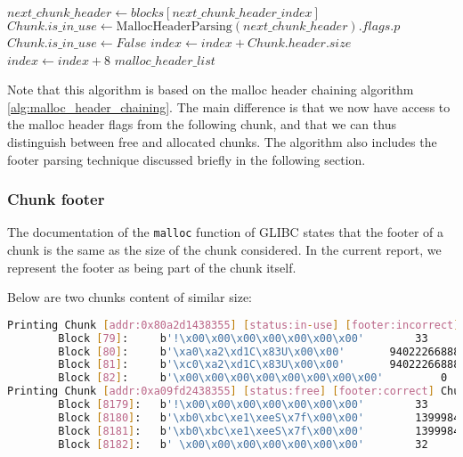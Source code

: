 \begin{algorithm}[H]
\begin{algorithmic}[1]
                        \State $next\_chunk\_header \gets blocks[next\_chunk\_header\_index]$
                        \State $Chunk.is\_in\_use \gets \text{MallocHeaderParsing}(next\_chunk\_header).flags.p$
                    \Else
                        \State $Chunk.is\_in\_use \gets False$ 
                    \EndIf
                    \State $index \gets index + Chunk.header.size$ 
                \Else
                    \State $index \gets index + 8$ 
                \EndIf
            \EndWhile
            \State \Return $malloc\_header\_list$
        \EndProcedure
        \end{algorithmic}
    \end{algorithm}

    Note that this algorithm is based on the malloc header chaining algorithm \ref{alg:malloc_header_chaining}. The main difference is that we now have access to the malloc header flags from the following chunk, and that we can thus distinguish between free and allocated chunks. The algorithm also includes the footer parsing technique discussed briefly in the following section.

    \subsubsection{Chunk footer}
    The documentation of the \texttt{malloc} function of GLIBC  states that the footer of a chunk is the same as the size of the chunk considered. In the current report, we represent the footer as being part of the chunk itself.

    Below are two chunks content of similar size:

    \begin{lstlisting}[language=bash, caption={Printing some free and in-use chunks from \textit{Training/basic/V\_7\_1\_P1/24/17016-1643962152-heap.raw}.}]
Printing Chunk [addr:0x80a2d1438355] [status:in-use] [footer:incorrect] Chunk(block_index=80, size=32, flags=[A=False, M=False, P=True])
        Block [79]: 	b'!\x00\x00\x00\x00\x00\x00\x00' 		33 		-malloc-header-
        Block [80]: 	b'\xa0\xa2\xd1C\x83U\x00\x00' 		94022266888864 		
        Block [81]: 	b'\xc0\xa2\xd1C\x83U\x00\x00' 		94022266888896 		
        Block [82]: 	b'\x00\x00\x00\x00\x00\x00\x00\x00' 		0 		-footer-
Printing Chunk [addr:0xa09fd2438355] [status:free] [footer:correct] Chunk(block_index=8180, size=32, flags=[A=False, M=False, P=True])
        Block [8179]: 	b'!\x00\x00\x00\x00\x00\x00\x00' 		33 		-malloc-header-
        Block [8180]: 	b'\xb0\xbc\xe1\xeeS\x7f\x00\x00' 		139998466784432 		
        Block [8181]: 	b'\xb0\xbc\xe1\xeeS\x7f\x00\x00' 		139998466784432 		
        Block [8182]: 	b' \x00\x00\x00\x00\x00\x00\x00' 		32 		-footer-
    \end{lstlisting}


